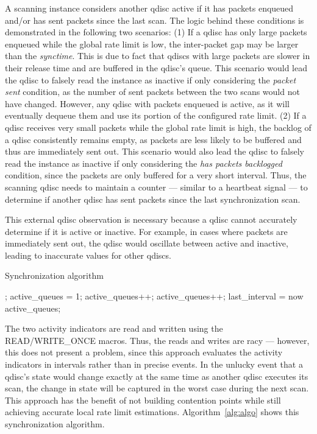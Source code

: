 A scanning instance considers another qdisc active if it has packets enqueued and/or has sent packets since the last scan.
%
The logic behind these conditions is demonstrated in the following two scenarios:
%
(1) If a qdisc has only large packets enqueued while the global rate limit is low, the inter-packet gap may be larger than the \textit{synctime}.
This is due to fact that qdiscs with large packets are slower in their release time and are buffered in the qdisc's queue.
%
This scenario would lead the qdisc to falsely read the instance as inactive if only considering the \textit{packet sent} condition, as the number of sent packets between the two scans  would not have changed.
%
However, any qdisc with packets enqueued is active, as it will eventually dequeue them and use its portion of the configured rate limit.
%
(2) If a qdisc receives very small packets while the global rate limit is high, the backlog of a qdisc consistently remains empty, as packets are less likely to be buffered and thus are immediately sent out.
%
This scenario would also lead the qdisc to falsely read the instance as inactive if only considering the \textit{has packets backlogged} condition, since the packets are only buffered for a very short interval.
%
Thus, the scanning qdisc needs to maintain a counter --- similar to a heartbeat signal --- to determine if another qdisc has sent packets since the last synchronization scan.
%

This external qdisc observation is necessary because a qdisc cannot accurately determine if it is active or inactive.
%
For example, in cases where packets are immediately sent out, the qdisc would oscillate between active and inactive, leading to inaccurate values for other qdiscs. 
%

\begin{algorithm}[t]
    \caption{Synchronization algorithm}\label{alg:algo}
\begin{algorithmic}[1]
    \State {};
\EndIf
\State active\_queues = 1;
    \State active\_queues++;
    \State active\_queues++;
    \EndIf
\EndFor
\State last\_interval = now
\State \Return active\_queues;
\EndProcedure
\end{algorithmic}
\end{algorithm}
The two activity indicators are read and written using the READ/WRITE\_ONCE macros.
%
Thus, the reads and writes are racy --- however, this does not present a problem, since this approach evaluates the activity indicators in intervals rather than in precise events.
%
In the unlucky event that a qdisc's state would change exactly at the same time as another qdisc executes its scan, the change in state will be captured in the worst case during the next scan.
%
This approach has the benefit of not building contention points while still achieving accurate local rate limit estimations.
%
Algorithm~\ref{alg:algo} shows this synchronization algorithm.
%
